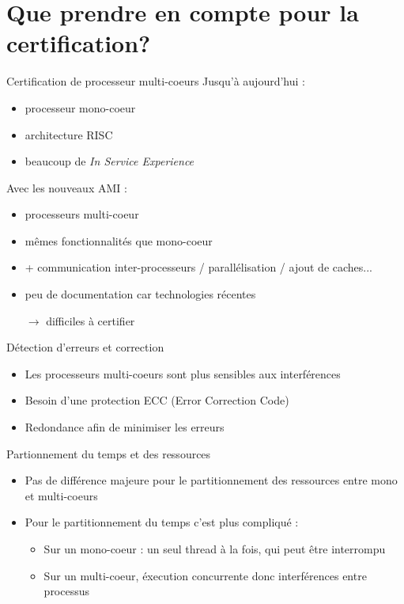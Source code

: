 \documentclass{beamer}
\begin{document}
\section[Certification]{Que prendre en compte pour la certification?}%
\label{sec:certification}
 
\begin{frame}{Certification de processeur multi-coeurs}
	Jusqu'à aujourd'hui :
	\begin{itemize}
		\item processeur mono-coeur
		\item architecture RISC
		\item beaucoup de \textit{In Service Experience}
	\end{itemize}
	\pause
	Avec les nouveaux AMI :
	\begin{itemize}
		\item processeurs multi-coeur
		\item mêmes fonctionnalités que mono-coeur
		\item + communication inter-processeurs / parallélisation / ajout de caches...
		\item peu de documentation car technologies récentes
		\item[$\rightarrow$] difficiles à certifier
	\end{itemize}
\end{frame}

\begin{frame}{Détection d'erreurs et correction}
	\begin{itemize}
		\item Les processeurs multi-coeurs sont plus sensibles aux interférences\pause
		\item Besoin d'une protection ECC (Error Correction Code)\pause
		\item Redondance afin de minimiser les erreurs
	\end{itemize}
\end{frame}

\begin{frame}{Partionnement du temps et des ressources}
	\begin{itemize}
		\item Pas de différence majeure pour le partitionnement des ressources entre mono
			et multi-coeurs\pause
		\item Pour le partitionnement du temps c'est plus compliqué :\pause
			\begin{itemize}
				\item Sur un mono-coeur : un seul thread à la fois, qui peut être
					interrompu\pause
				\item Sur un multi-coeur, éxecution concurrente donc interférences entre
					processus
			\end{itemize}
	\end{itemize}
\end{frame}
\end{document}
